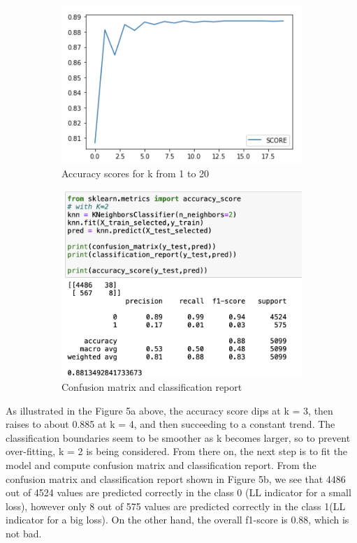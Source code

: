 \documentclass[12pt]{article} %
\theoremstyle{definition}
\begin{document}
\begin{figure}[h]
    \centering
    \begin{subfigure}{.48\textwidth}
        \centering
        \includegraphics[width=\linewidth]{KNN/kPlot.png}
        \caption{Accuracy scores for k from 1 to 20}
    \end{subfigure}
    \hfill
    \begin{subfigure}{.48\linewidth}
        \centering
        \includegraphics[width=\linewidth]{KNN/validate.png}
        \caption{Confusion matrix and classification report}
    \end{subfigure}
    \caption{}
\end{figure}

As illustrated in the Figure 5a above, the accuracy score dips at k = 3, then raises to about 0.885 at k = 4, and then succeeding to a constant trend. The classification boundaries seem to be smoother as k becomes larger, so to prevent over-fitting, k = 2 is being considered. From there on, the next step is to fit the model and compute confusion matrix and classification report. From the confusion matrix and classification report shown in Figure 5b, we see that 4486 out of 4524 values are predicted correctly in the class 0 (LL indicator for a small loss), however only 8 out of 575 values are predicted correctly in the class 1(LL indicator for a big loss). On the other hand, the overall f1-score is 0.88, which is not bad.
\end{document}
